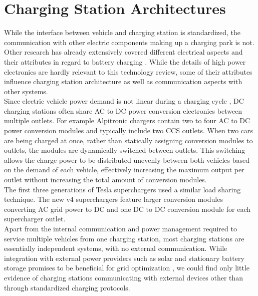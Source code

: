 \documentclass[conference,flushend]{iaria} %
\begin{document}
\section{Charging Station Architectures}
While the interface between vehicle and charging station is standardized, the communication with other electric components making up a charging park is not.
Other research has already extensively covered different electrical aspects and their attributes in regard to battery charging \cite{tu_extreme_2019, das_electric_2020, deb_review_2021}.
While the details of high power electronics are hardly relevant to this technology review, some of their attributes influence charging station architecture as well as communication aspects with other systems. \\
Since electric vehicle power demand is not linear during a charging cycle \cite{noauthor_audi_nodate}, DC charging stations often share AC to DC power conversion electronics between multiple outlets.
For example Alpitronic chargers contain two to four AC to DC power conversion modules and typically include two CCS outlets.
When two cars are being charged at once, rather than statically assigning conversion modules to outlets, the modules are dynamically switched between outlets.
This switching allows the charge power to be distributed unevenly between both vehicles based on the demand of each vehicle, effectively increasing the maximum output per outlet without increasing the total amount of conversion modules. \\
The first three generations of Tesla superchargers used a similar load sharing technique.
The new v4 superchargers feature larger conversion modules converting AC grid power to DC and one DC to DC conversion module for each supercharger outlet. \\
Apart from the internal communication and power management required to service multiple vehicles from one charging station, most charging stations are essentially independent systems, with no external communication.
While integration with external power providers such as solar and stationary battery storage promises to be beneficial for grid optimization \cite{deb_review_2021}, we could find only little evidence of charging stations communicating with external devices other than through standardized charging protocols.

\iffalse
\end{document}
